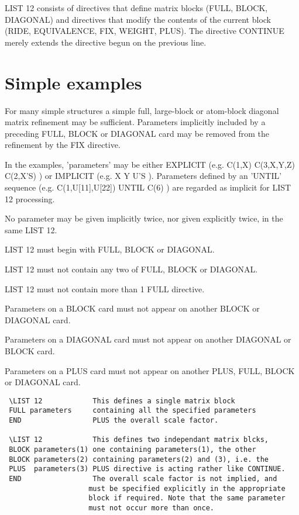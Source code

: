 \documentclass[10pt,a4paper]{report}
\begin{document}
LIST 12 consists of directives that define matrix blocks (FULL, BLOCK,
 DIAGONAL) and directives that modify the contents of the current block
 (RIDE, EQUIVALENCE, FIX, WEIGHT, PLUS). The directive CONTINUE merely extends
 the directive begun on the previous line.



\section{Simple examples}


For many simple structures a simple full, large-block or atom-block
 diagonal matrix refinement may be sufficient. Parameters implicitly
 included by a preceding FULL, BLOCK or DIAGONAL card may be removed from the
 refinement by the FIX directive.


\bigskip{}




In the examples, 'parameters' may be either EXPLICIT (e.g. C(1,X)
 C(3,X,Y,Z) C(2,X'S) ) or IMPLICIT (e.g. X  Y U'S ). Parameters defined
 by an 'UNTIL' sequence (e.g. C(1,U[11],U[22]) UNTIL C(6) )
 are regarded as implicit for LIST 12 processing.


No parameter may be given implicitly twice, nor given explicitly twice,
 in the same LIST 12.


\bigskip{}




LIST 12 must begin with FULL, BLOCK or DIAGONAL.


LIST 12 must not contain any two of FULL, BLOCK or DIAGONAL.


LIST 12 must not contain more than 1 FULL directive. 





Parameters on a BLOCK card must not appear on another BLOCK or DIAGONAL card.


Parameters on a DIAGONAL card must not appear on another DIAGONAL or
 BLOCK card.


Parameters on a PLUS card must not appear on another PLUS, FULL, BLOCK or
 DIAGONAL card.
\small\begin{verbatim}
 \LIST 12            This defines a single matrix block          
 FULL parameters     containing all the specified parameters 
 END                 PLUS the overall scale factor.
 
 \LIST 12            This defines two independant matrix blcks,
 BLOCK parameters(1) one containing parameters(1), the other
 BLOCK parameters(2) containing parameters(2) and (3), i.e. the
 PLUS  parameters(3) PLUS directive is acting rather like CONTINUE.
 END                 The overall scale factor is not implied, and
                    must be specified explicitly in the appropriate
                    block if required. Note that the same parameter
                    must not occur more than once.
\end{verbatim}\normalsize
\end{document}
